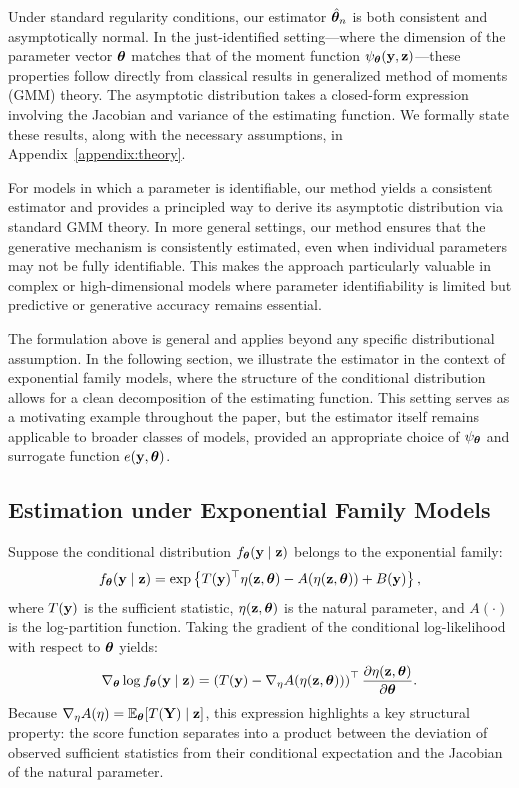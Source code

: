 \documentclass[twoside,11pt]{article}
\begin{document}
Under standard regularity conditions, our estimator $\hat{{\bm{\theta}}}_n$ is both consistent and asymptotically normal. In the just-identified setting—where the dimension of the parameter vector ${\bm{\theta}}$ matches that of the moment function $\psi_{\bm{\theta}}({\bf y}, {\bf z})$—these properties follow directly from classical results in generalized method of moments (GMM) theory. The asymptotic distribution takes a closed-form expression involving the Jacobian and variance of the estimating function. We formally state these results, along with the necessary assumptions, in Appendix~\ref{appendix:theory}.

For models in which a parameter is identifiable, our method yields a consistent estimator and provides a principled way to derive its asymptotic distribution via standard GMM theory. In more general settings, our method ensures that the generative mechanism is consistently estimated, even when individual parameters may not be fully identifiable. This makes the approach particularly valuable in complex or high-dimensional models where parameter identifiability is limited but predictive or generative accuracy remains essential.


The formulation above is general and applies beyond any specific distributional assumption. In the following section, we illustrate the estimator in the context of exponential family models, where the structure of the conditional distribution allows for a clean decomposition of the estimating function. This setting serves as a motivating example throughout the paper, but the estimator itself remains applicable to broader classes of models, provided an appropriate choice of $\psi_{\bm{\theta}}$ and surrogate function $e({\bf y}, {\bm{\theta}})$.




\subsection{Estimation under Exponential Family Models}

Suppose the conditional distribution \( f_{\bm{\theta}}({\bf y} \mid {\bf z}) \) belongs to the exponential family:
\[
f_{\bm{\theta}}({\bf y} \mid {\bf z}) = \exp\left\{ T({\bf y})^\top \eta({\bf z}, {\bm{\theta}}) - A(\eta({\bf z}, {\bm{\theta}})) + B({\bf y}) \right\},
\]
where \( T({\bf y}) \) is the sufficient statistic, \( \eta({\bf z}, {\bm{\theta}}) \) is the natural parameter, and \( A(\cdot) \) is the log-partition function. Taking the gradient of the conditional log-likelihood with respect to \({\bm{\theta}}\) yields:
\[
\nabla_{\bm{\theta}} \log f_{\bm{\theta}}({\bf y} \mid {\bf z}) = \left( T({\bf y}) - \nabla_\eta A(\eta({\bf z}, {\bm{\theta}})) \right)^\top \frac{\partial \eta({\bf z}, {\bm{\theta}})}{\partial {\bm{\theta}}}.
\]
Because \( \nabla_\eta A(\eta) = \mathbb{E}_{\bm{\theta}}[T({\bf Y}) \mid {\bf z}] \), this expression highlights a key structural property: the score function separates into a product between the deviation of observed sufficient statistics from their conditional expectation and the Jacobian of the natural parameter.
\end{document}
